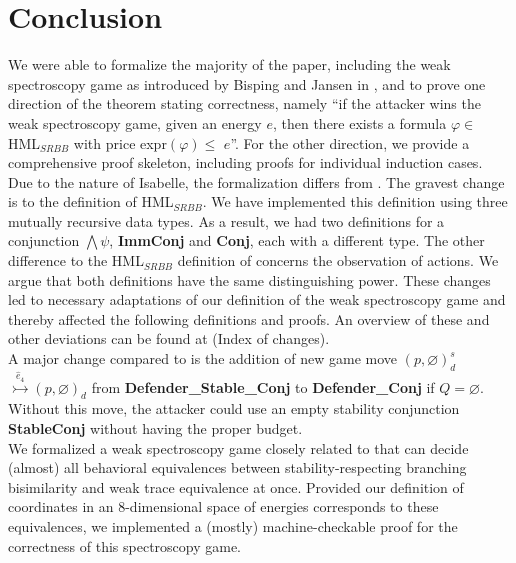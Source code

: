\section{Conclusion}
We were able to formalize the majority of the paper, including the weak spectroscopy game as introduced by Bisping and Jansen in \cite{bisping2023lineartimebranchingtime}, 
and to prove one direction of the theorem stating correctness, namely ``if the attacker wins the weak spectroscopy game, given an energy $e$, then there exists a formula $\varphi \in$ HML$_{SRBB}$ with price expr$(\varphi) \leq$ $e$''. 
For the other direction, we provide a comprehensive proof skeleton, including proofs for individual induction cases.
\\
Due to the nature of Isabelle, the formalization differs from \cite{bisping2023lineartimebranchingtime}. The gravest change is to the definition of HML$_{SRBB}$. 
We have implemented this definition using three mutually recursive data types. As a result, we had two definitions for a conjunction $\bigwedge\psi$, \textbf{ImmConj} and \textbf{Conj}, each with a different type. 
The other difference to the HML$_{SRBB}$ definition of \cite{bisping2023lineartimebranchingtime} concerns the observation of actions. 
We argue that both definitions have the same distinguishing power. 
These changes led to necessary adaptations of our definition of the weak spectroscopy game and thereby affected the following definitions and proofs.
An overview of these and other deviations can be found at (Index of changes). 
\\
A major change compared to \cite{bisping2023lineartimebranchingtime} is the addition of new game move $(p,\varnothing)_{d}^{s}$ $\overset{\hat{e}_4}{\rightarrowtail} (p,\varnothing)_d$ from \textbf{Defender\_Stable\_Conj} to \textbf{Defender\_Conj} if $Q = \varnothing$. 
Without this move, the attacker could use an empty stability conjunction \textbf{StableConj} without having the proper budget. 
\\
We formalized a weak spectroscopy game closely related to \cite{bisping2023lineartimebranchingtime} that can decide (almost) all behavioral equivalences between stability-respecting branching bisimilarity and weak trace equivalence at once.
Provided our definition of coordinates in an 8-dimensional space of energies corresponds to these equivalences, we implemented a (mostly) machine-checkable proof for the correctness of this spectroscopy game.

